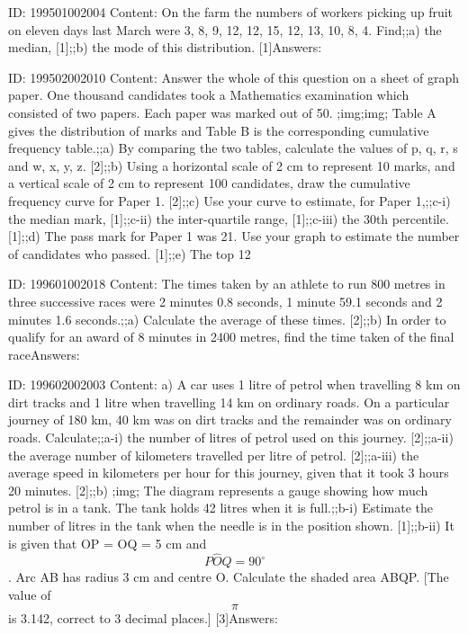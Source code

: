 \documentclass{article}
\begin{document}
ID: 199501002004
Content:
On the farm the numbers of workers picking up fruit on eleven days last March were 3, 8, 9, 12, 12, 15, 12, 13, 10, 8, 4. Find;;a) the median, [1];;b) the mode of this distribution. [1]Answers:

ID: 199502002010
Content:
Answer the whole of this question on a sheet of graph paper. One thousand candidates took a Mathematics examination which consisted of two papers. Each paper was marked out of 50. ;img;img; Table A gives the distribution of marks and Table B is the corresponding cumulative frequency table.;;a) By comparing the two tables, calculate the values of p, q, r, s and w, x, y, z. [2];;b) Using a horizontal scale of 2 cm to represent 10 marks, and a vertical scale of 2 cm to represent 100 candidates, draw the cumulative frequency curve for Paper 1. [2];;c) Use your curve to estimate, for Paper 1,;;c-i) the median mark, [1];;c-ii) the inter-quartile range, [1];;c-iii) the 30th percentile. [1];;d) The pass mark for Paper 1 was 21. Use your graph to estimate the number of candidates who passed. [1];;e) The top 12%

ID: 199601002018
Content:
The times taken by an athlete to run 800 metres in three successive races were 2 minutes 0.8 seconds, 1 minute 59.1 seconds and 2 minutes 1.6 seconds.;;a) Calculate the average of these times. [2];;b) In order to qualify for an award of 8 minutes in 2400 metres, find the time taken of the final raceAnswers:

ID: 199602002003
Content:
a) A car uses 1 litre of petrol when travelling 8 km on dirt tracks and 1 litre when travelling 14 km on ordinary roads. On a particular journey of 180 km, 40 km was on dirt tracks and the remainder was on ordinary roads. Calculate;;a-i) the number of litres of petrol used on this journey. [2];;a-ii) the average number of kilometers travelled per litre of petrol. [2];;a-iii) the average speed in kilometers per hour for this journey, given that it took 3 hours 20 minutes. [2];;b) ;img; The diagram represents a gauge showing how much petrol is in a tank. The tank holds 42 litres when it is full.;;b-i) Estimate the number of litres in the tank when the needle is in the position shown. [1];;b-ii) It is given that OP = OQ = 5 cm and  $$P \hat OQ = 90^{\circ}$$. Arc AB has radius 3 cm and centre O. Calculate the shaded area ABQP. [The value of $$\pi$$ is 3.142, correct to 3 decimal places.] [3]Answers:
\end{document}
